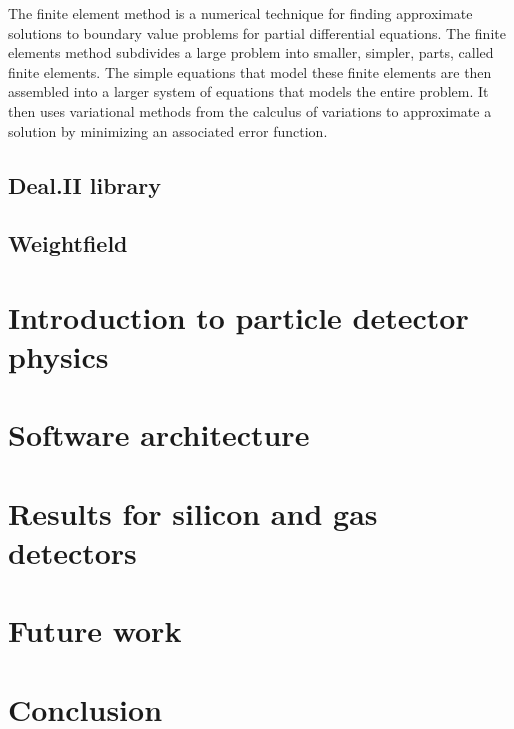 \documentclass[11pt]{article}
\begin{document}
		The finite element method is a numerical technique for
		finding approximate solutions to boundary value problems for partial
		differential equations. The finite elements method subdivides a large
		problem into smaller, simpler, parts, called finite elements. The
		simple equations that model these finite elements are then assembled
		into a larger system of equations that models the entire problem. It
		then uses variational methods from the calculus of variations to
		approximate a solution by minimizing an associated error function.

	\subsection{Deal.II library}

	\subsection{Weightfield}

\section{Introduction to particle detector physics}

\section{Software architecture}

\section{Results for silicon and gas detectors}

\section{Future work}

\section{Conclusion}
\end{document}
